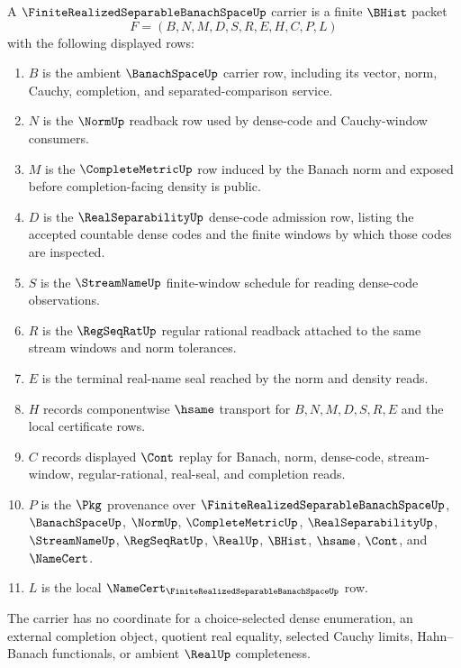 \begin{definition}
\label{def:finite-realized-separable-banach-space-carrier}
A $\FiniteRealizedSeparableBanachSpaceUp$ carrier is a finite $\BHist$ packet
$$
F=(B,N,M,D,S,R,E,H,C,P,L)
$$
with the following displayed rows:
\begin{enumerate}
\item $B$ is the ambient $\BanachSpaceUp$ carrier row, including its vector, norm, Cauchy, completion, and separated-comparison service.
\item $N$ is the $\NormUp$ readback row used by dense-code and Cauchy-window consumers.
\item $M$ is the $\CompleteMetricUp$ row induced by the Banach norm and exposed before completion-facing density is public.
\item $D$ is the $\RealSeparabilityUp$ dense-code admission row, listing the accepted countable dense codes and the finite windows by which those codes are inspected.
\item $S$ is the $\StreamNameUp$ finite-window schedule for reading dense-code observations.
\item $R$ is the $\RegSeqRatUp$ regular rational readback attached to the same stream windows and norm tolerances.
\item $E$ is the terminal real-name seal reached by the norm and density reads.
\item $H$ records componentwise $\hsame$ transport for $B,N,M,D,S,R,E$ and the local certificate rows.
\item $C$ records displayed $\Cont$ replay for Banach, norm, dense-code, stream-window, regular-rational, real-seal, and completion reads.
\item $P$ is the $\Pkg$ provenance over $\FiniteRealizedSeparableBanachSpaceUp$, $\BanachSpaceUp$, $\NormUp$, $\CompleteMetricUp$, $\RealSeparabilityUp$, $\StreamNameUp$, $\RegSeqRatUp$, $\RealUp$, $\BHist$, $\hsame$, $\Cont$, and $\NameCert$.
\item $L$ is the local $\NameCert_{\FiniteRealizedSeparableBanachSpaceUp}$ row.
\end{enumerate}
The carrier has no coordinate for a choice-selected dense enumeration, an external completion object, quotient real equality, selected Cauchy limits, Hahn--Banach functionals, or ambient $\RealUp$ completeness.
\end{definition}

